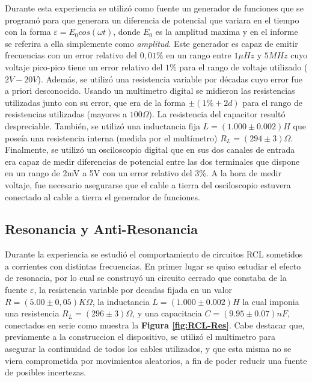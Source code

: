 \documentclass[11pt,a4paper]{article}
\begin{document}
Durante esta experiencia se utilizó como fuente un generador de funciones que se programó para que generara un diferencia de potencial que variara en el tiempo con la forma $\varepsilon = E_{0}cos(\omega t)$, donde $E_{0}$ es la amplitud maxima y en el informe se referira a ella simplemente como \textit{amplitud}. Este generador es capaz de emitir frecuencias con un error relativo del $0,01\%$ en un rango entre $1\mu Hz$ y $5MHz$ cuyo voltaje pico-pico tiene un error relativo del $1\%$ para el rango de voltaje utilizado ($2V-20V$). Además, se utilizó una resistencia variable por décadas cuyo error fue a priori desconocido. Usando un multimetro digital se midieron las resistencias utilizadas junto con su error, que era de la forma $\pm(1\%+2d)$ para el rango de resistencias utilizadas (mayores a $100\Omega$). La resistencia del capacitor resultó despreciable. También, se utilizó una inductancia fija $L = (1.000 \pm 0.002) H$ que poseía una resistencia interna (medida por el multímetro) $R_L = (294 \pm 3) \Omega$.
Finalmente, se utilizó un osciloscopio digital que en sus dos canales de entrada era capaz de medir diferencias de potencial entre las dos terminales que dispone en un rango de 2mV a 5V con un error relativo del $3\%$. A la hora de medir voltaje, fue necesario asegurarse que el cable a tierra del osciloscopio estuvera conectado al cable a tierra el generador de funciones. 



\subsection{Resonancia y Anti-Resonancia}
Durante la experiencia se estudió el comportamiento de circuitos RCL sometidos a corrientes con distintas frecuencias. En primer lugar se quiso estudiar el efecto de resonacia, por lo cual se construyó un circuito cerrado que constaba de la fuente $\varepsilon$, la resistencia variable por decadas fijada en un valor $R = (5.00 \pm 0,05)K\Omega$, la inductancia $L = (1.000 \pm 0.002)H$ la cual imponia una resistencia $R_{L}= (296\pm 3)\Omega$, y una capacitacia $C = (9.95 \pm 0.07)nF$, conectados en serie como muestra la \textbf{Figura \ref{fig:RCL-Res}}. Cabe destacar que, previamente a la construccion el dispositivo,  se utilizó el multimetro para asegurar la continuidad de todos los cables utilizados, y que esta misma no se viera comprometida por movimientos aleatorios, a fin de poder reducir una fuente de posibles incertezas.
\end{document}
